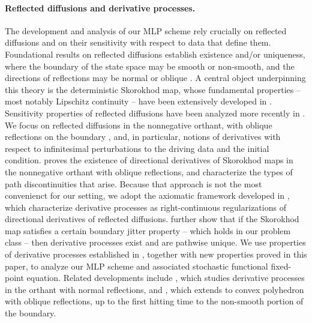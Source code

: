 \documentclass[11pt]{article}
\theoremstyle{definition}
\theoremstyle{plain}
\begin{document}
\paragraph{Reflected diffusions and derivative processes.} 
The development and analysis of our MLP scheme rely crucially on reflected diffusions and on their sensitivity 
with respect to data that define them. 
Foundational results on reflected diffusions establish existence and/or uniqueness, where the boundary of the state space may be smooth or non-smooth, 
and the directions of reflections may be normal or oblique 
\cite{Skorokhod1961, Skorokhod1962, Costantini1992, DupuisIshii1993, DupuisIshii2008corr, HarrisonReiman1981, LionsSznitman1984, 
Saisho1987, StroockVaradhan1971, Tanaka1979, TaylorWilliams1993, VaradhanWilliams1985}. 
A central object underpinning this theory is the deterministic Skorokhod map, 
whose fundamental properties -- most notably Lipschitz continuity -- have been extensively developed in \cite{DupuisIshii1991, DupuisRamanan1999I, DupuisRamanan1999II, HarrisonReiman81,REF}. 
Sensitivity properties of reflected diffusions have been analyzed more recently in \cite{MandelbaumRamanan2010,LipshutzRamanan2018,LipshutzRamanan2019a,LipshutzRamanan2019b,Andres2009,DeuschelZambotti2005}. 
We focus on reflected diffusions in the nonnegative orthant, with oblique reflections on the boundary \cite{HarrisonReiman1981}, 
and, in particular, notions of derivatives with respect to infinitesimal perturbations to the driving data and the initial condition. 
\cite{MandelbaumRamanan2010} proves the existence of directional derivatives of Skorokhod maps in the nonnegative orthant with oblique reflections, 
and characterize the types of path discontinuities that arise. Because that approach is not the most convenienct for our setting, 
we adopt the axiomatic framework developed in \cite{LipshutzRamanan2018,LipshutzRamanan2019b}, 
which characterize derivative processes as right-continuous regularizations of directional derivatives of reflected diffusions. 
\cite{LipshutzRamanan2018,LipshutzRamanan2019b} further show that if the Skorokhod map satisfies a certain boundary jitter property -- 
which holds in our problem class -- then derivative processes exist and are pathwise unique. 
We use properties of derivative processes established in \cite{LipshutzRamanan2018,LipshutzRamanan2019b}, 
together with new properties proved in this paper, to analyze our MLP scheme and associated stochastic functional fixed-point equation. 
Related developments include \cite{DeuschelZambotti2005}, which studies derivative processes in the orthant with normal reflections, 
and \cite{Andres2009}, which extends \cite{DeuschelZambotti2005} to convex polyhedron with oblique reflections, up to the first hitting time to the non-smooth portion of the boundary.
\end{document}
